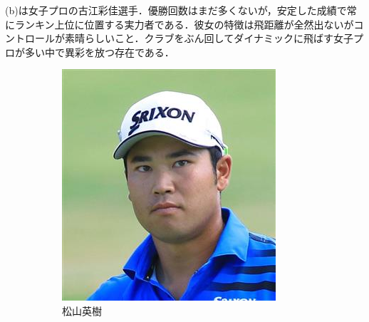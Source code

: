 \documentclass[a4j, twocolumn]{jarticle}
\begin{document}
\vspace{-15pt}

(b)は女子プロの古江彩佳選手．優勝回数はまだ多くないが，安定した成績で常にランキン上位に位置する実力者である．彼女の特徴は飛距離が全然出ないがコントロールが素晴らしいこと．クラブをぶん回してダイナミックに飛ばす女子プロが多い中で異彩を放つ存在である．

\begin{figure}[htb]
    \centering
    \begin{subfigure}[b]{0.12\textwidth}
        \centering
        \includegraphics[height=\textwidth]{matuyama.jpg}
        \vspace{-1.0mm}
        \caption{松山英樹}
        \label{matuyamaimg}
    \end{subfigure}
    \begin{subfigure}[b]{0.12\textwidth}
        \centering

\end{subfigure}
\end{figure}
\end{document}
